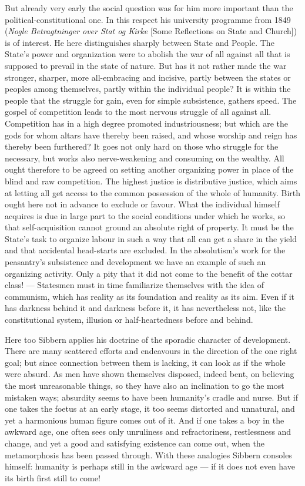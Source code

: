 \documentclass[12pt,a4paper]{book}
\newcommand{\opage}[1]{\marginnote{\footnotesize\textit{[#1]}}}
\begin{document}
But already very early the social question was for him more important than the
political-constitutional one. In this respect his university programme from 1849 (\emph{Nogle
Betragtninger over Stat og Kirke} [Some Reflections on State and Church]) is of interest. He here
distinguishes sharply between State and People. The State's power and organization were to abolish
the war of all against all that is supposed to prevail in the state of nature. But has it not
rather made the war stronger, sharper, more all-embracing and incisive, partly between the states
or peoples among themselves, partly within the individual people? It is within the people that the
struggle for gain, even for simple subsistence, gathers speed. The gospel of competition leads to
the most nervous struggle of all against all. Competition has in a high degree promoted
industriousness; but which are the gods for whom altars have thereby been raised, and whose
worship and reign has thereby been furthered? It goes not only hard on those who struggle for the
necessary, but works also nerve-weakening and consuming on the wealthy. All ought therefore to be
agreed on \opage{114}setting another organizing power in place of the blind and raw competition. The highest
justice is distributive justice, which aims at letting all get access to the common possession of
the whole of humanity. Birth ought here not in advance to exclude or favour. What the individual
himself acquires is due in large part to the social conditions under which he works, so that
self-acquisition cannot ground an absolute right of property. It must be the State's task to
organize labour in such a way that all can get a share in the yield and that accidental
head-starts are excluded. In the absolutism's work for the peasantry's subsistence and
development we have an example of such an organizing activity. Only a pity that it did not come to
the benefit of the cottar class! --- Statesmen must in time familiarize themselves with the idea
of communism, which has reality as its foundation and reality as its aim. Even if it has darkness
behind it and darkness before it, it has nevertheless not, like the constitutional system,
illusion or half-heartedness before and behind.

Here too Sibbern applies his doctrine of the sporadic character of development. There are many
scattered efforts and endeavours in the direction of the one right goal; but since connection
between them is lacking, it can look as if the whole were absurd. As men have shown themselves
disposed, indeed bent, on believing the most unreasonable things, so they have also an inclination
to go the most mistaken ways; absurdity seems to have been humanity's cradle and nurse. But if one
takes the foetus at an early stage, it too seems distorted and unnatural, and yet a harmonious
human figure comes out of it. And if one takes a boy in the awkward age, one often sees only
unruliness and refractoriness, restlessness and change, and yet a good and satisfying existence can
come out, when the metamorphosis has been passed through. With these analogies Sibbern consoles
himself: humanity is perhaps still in the awkward age --- if it does not even have its birth first
still to come!
\end{document}
